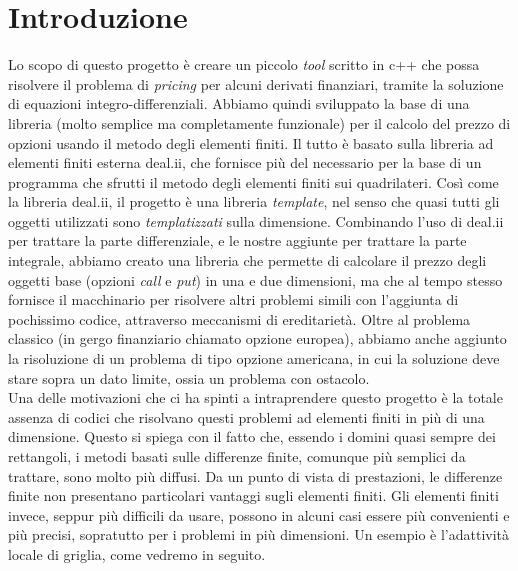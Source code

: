 \documentclass[a4paper,10pt]{report}
\theoremstyle{plain}
\theoremstyle{definition}
\theoremstyle{remark}
\begin{document}
	\clearpage
	\thispagestyle{empty}
	
	\clearpage

\clearpage
\thispagestyle{plain}
\par\vspace*{.35\textheight}{\raggedleft An approximate answer to the right problem is worth a good deal more than an exact answer to an approximate problem.\par}
\par\vspace{1cm}{\raggedleft John Tukey\par}

\tableofcontents
\listoffigures
\listoftables

\chapter*{Introduzione}

Lo scopo di questo progetto è creare un piccolo \emph{tool} scritto in c++ che possa risolvere il problema di \emph{pricing} per alcuni derivati finanziari, tramite la soluzione di equazioni integro-differenziali. Abbiamo quindi sviluppato la base di una libreria (molto semplice ma completamente funzionale) per il calcolo del prezzo di opzioni usando il metodo degli elementi finiti. Il tutto è basato sulla libreria ad elementi finiti esterna \textsf{deal.ii}, che fornisce pi\`u del necessario per la base di un programma che sfrutti il metodo degli elementi finiti sui quadrilateri. Cos\`i come la libreria \textsf{deal.ii}, il progetto \`e una libreria \emph{template}, nel senso che quasi tutti gli oggetti utilizzati sono \emph{templatizzati} sulla dimensione. Combinando l'uso di \textsf{deal.ii} per trattare la parte differenziale, e le nostre aggiunte per trattare la parte integrale, abbiamo creato una libreria che permette di calcolare il prezzo degli oggetti base (opzioni \emph{call} e \emph{put}) in una e due dimensioni, ma che al tempo stesso fornisce il macchinario per risolvere altri problemi simili con l'aggiunta di pochissimo codice, attraverso meccanismi di ereditarietà. Oltre al problema classico (in gergo finanziario chiamato opzione europea), abbiamo anche aggiunto la risoluzione di un problema di tipo opzione americana, in cui la soluzione deve stare sopra un dato limite, ossia un problema con ostacolo.\\

Una delle motivazioni che ci ha spinti a intraprendere questo progetto è la totale assenza di codici che risolvano questi problemi ad elementi finiti in più di una dimensione. Questo si spiega con il fatto che, essendo i domini quasi sempre dei rettangoli, i metodi basati sulle differenze finite, comunque pi\`u semplici da trattare, sono molto più diffusi. Da un punto di vista di prestazioni, le differenze finite non presentano particolari vantaggi sugli elementi finiti. Gli elementi finiti invece, seppur più difficili da usare, possono in alcuni casi essere più convenienti e pi\`u precisi, sopratutto per i problemi in più dimensioni. Un esempio è l'adattività locale di griglia, come vedremo in seguito.\\
\end{document}
